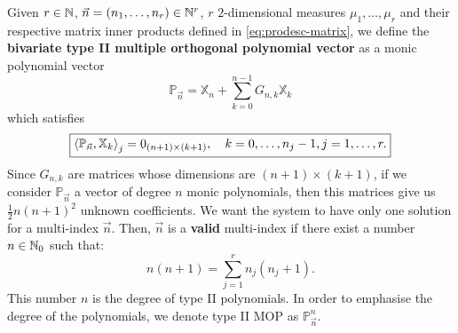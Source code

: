 \documentclass[portrait,final,a0paper,fontscale=0.38]{baposter}
\begin{document}
\begin{poster}
{%
	}
%
	{
  Given $r\in\mathbb{N}$, $\vec n = (n_1,\dots, n_r)\in\mathbb{N}^r$, $r$ $2$-dimensional measures $\mu_1, \dots, \mu_r$ and their respective matrix inner products defined in \eqref{eq:prodesc-matrix}, we define the \textbf{bivariate type II multiple orthogonal polynomial vector} as a monic polynomial vector $$\mathbb P_{\vec n} = \mathbb X_n + \displaystyle\sum_{k=0}^{n-1}G_{n,k} \mathbb X_k$$ which satisfies
\begin{equation}
    \label{eq:typeII-MOP-d-variables}
    \boxed{
    \left\langle \mathbb P_{\vec n} , \mathbb X_k \right\rangle_j = 0_{(n+1)\times (k+1)}, \ \ \ k=0,\dots,n_j-1, j=1,\dots,r.}
\end{equation}
Since $G_{n,k}$ are matrices whose dimensions are $(n+1)\times (k+1)$, if we consider $\mathbb P_{\vec n}$ a vector of degree $n$ monic polynomials, then this matrices give us $\frac 1 2 n (n+1)^2 $ unknown coefficients. We want the system to have only one solution for a multi-index $\vec n$. Then, $\vec n$ is a \textbf{valid} multi-index if there exist a number $n\in\mathbb{N}_0$ such that:
\begin{equation}
    \label{eq:condition-type-ii}
    \boxed{n(n+1) = \sum_{j=1}^r n_j (n_j+1).}
\end{equation}
This number $n$ is the degree of type II polynomials. In order to emphasise the degree of the polynomials, we denote type II MOP as $\mathbb P_{\vec n}^n$.

}


\end{poster}
\end{document}
